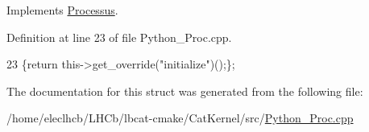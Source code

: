 Implements \hyperlink{classProcessus_aee88ad7b77ae7319cf8b128e9dd2ea11}{Processus}.



Definition at line 23 of file Python\+\_\+\+Proc.\+cpp.


\begin{DoxyCode}
23 \{\textcolor{keywordflow}{return} this->get\_override(\textcolor{stringliteral}{"initialize"})();\};
\end{DoxyCode}


The documentation for this struct was generated from the following file\+:\begin{DoxyCompactItemize}
\item 
/home/eleclhcb/\+L\+H\+Cb/lbcat-\/cmake/\+Cat\+Kernel/src/\hyperlink{Python__Proc_8cpp}{Python\+\_\+\+Proc.\+cpp}\end{DoxyCompactItemize}

